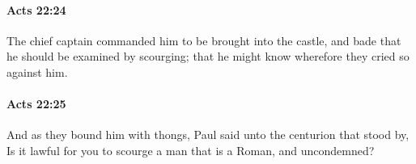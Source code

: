 		\paragraph{Acts 22:24} %
			\label{ACTS-22-24}

			The chief captain commanded him to be brought into the castle, and bade that he should be examined by scourging; that he might know wherefore they cried so against him.

			\begin{framed}
			\scriptsize
				\begin{compactdesc}
					\item[SBLG] 
				\end{compactdesc}
			\end{framed}

		\paragraph{Acts 22:25} %
			\label{ACTS-22-25}

			And as they bound him with thongs, Paul said unto the centurion that stood by, Is it lawful for you to scourge a man that is a Roman, and uncondemned?

